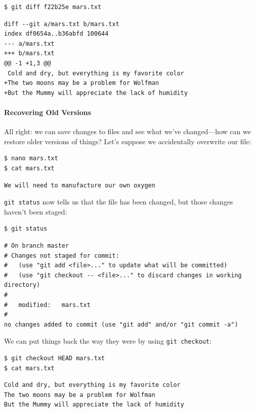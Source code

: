 \documentclass{book}
\begin{document}
\begin{verbatim}
$ git diff f22b25e mars.txt
\end{verbatim}

\begin{verbatim}
diff --git a/mars.txt b/mars.txt
index df0654a..b36abfd 100644
--- a/mars.txt
+++ b/mars.txt
@@ -1 +1,3 @@
 Cold and dry, but everything is my favorite color
+The two moons may be a problem for Wolfman
+But the Mummy will appreciate the lack of humidity
\end{verbatim}

\mbox{}\paragraph{Recovering Old Versions}

All right: we can save changes to files and see what we've changed---how
can we restore older versions of things? Let's suppose we accidentally
overwrite our file:

\begin{verbatim}
$ nano mars.txt
$ cat mars.txt
\end{verbatim}

\begin{verbatim}
We will need to manufacture our own oxygen
\end{verbatim}

\texttt{git status} now tells us that the file has been changed, but
those changes haven't been staged:

\begin{verbatim}
$ git status
\end{verbatim}

\begin{verbatim}
# On branch master
# Changes not staged for commit:
#   (use "git add <file>..." to update what will be committed)
#   (use "git checkout -- <file>..." to discard changes in working directory)
#
#   modified:   mars.txt
#
no changes added to commit (use "git add" and/or "git commit -a")
\end{verbatim}

We can put things back the way they were by using \texttt{git checkout}:

\begin{verbatim}
$ git checkout HEAD mars.txt
$ cat mars.txt
\end{verbatim}

\begin{verbatim}
Cold and dry, but everything is my favorite color
The two moons may be a problem for Wolfman
But the Mummy will appreciate the lack of humidity
\end{verbatim}
\end{document}
